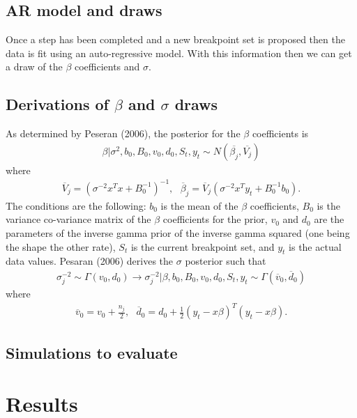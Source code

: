 \documentclass[submit]{smj}
\begin{document}
\subsection{AR model and draws}
Once a step has been completed and a new breakpoint set is proposed then the data is fit using an auto-regressive model.  With this information then we can get a draw of the $\beta$ coefficients and $\sigma$.

\subsection{Derivations of $\beta$ and $\sigma$ draws}

As determined by Peseran (2006), the posterior for the $\beta$ coefficients is 
\begin{align*}
\beta | \sigma^2, b_0, B_0, v_0, d_0 , S_{t}, y_{t} \sim N( \overline{\beta_j } , \overline{V_j} )
\end{align*}
where 
\begin{align*}
\overline{V}_j = (\sigma^{-2}x^Tx + B_0^{-1})^{-1}, \ \ \  \overline{\beta}_j = \overline{V}_j(\sigma^{-2}x^Ty_t + B_0^{-1}b_0).
\end{align*}
The conditions are the following: $b_0$ is the mean of the $\beta$ coefficients, $B_0$ is the variance co-variance matrix of the $\beta$ coefficients for the prior, $v_0$ and $d_0$ are the parameters of the inverse gamma prior of the inverse gamma squared (one being the shape the other rate), $S_t$ is the current breakpoint set, and $y_t$ is the actual data values. 
Pesaran (2006) derives the $\sigma$ posterior such that 
\begin{align*}
\sigma_j^{-2} \sim  \Gamma(v_0, d_0) \longrightarrow \sigma^{-2}_j | \beta, b_0, B_0, v_0, d_0 , S_{t}, y_{t} \sim \Gamma ( \overline{v}_0,  \overline{d}_0)
\end{align*}
where 
\begin{align*}
\overline{v}_0 = v_0 + \frac{n_j}{2} , \ \ \  \overline{d}_0 = d_0 + \frac{1}{2}(y_t-x\beta)^T(y_t-x\beta).
\end{align*}


\subsection{Simulations to evaluate}

\section{Results}
\end{document}
